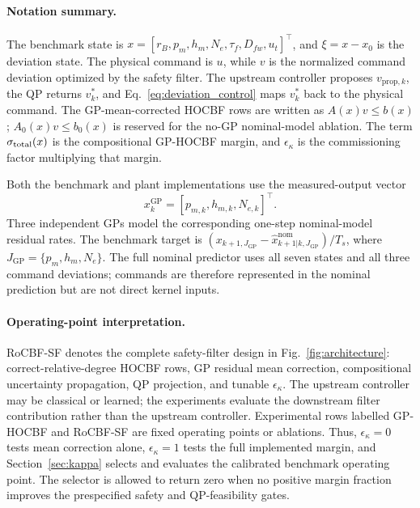 \paragraph{Notation summary.}
The benchmark state is $x=[r_B,p_m,h_m,N_e,\tau_f,D_{fw},u_t]^\top$, and $\xi=x-x_0$ is the deviation state. The physical command is $u$, while $v$ is the normalized command deviation optimized by the safety filter. The upstream controller proposes $v_{\mathrm{prop},k}$, the QP returns $v_k^*$, and Eq.~\eqref{eq:deviation_control} maps $v_k^*$ back to the physical command. The GP-mean-corrected HOCBF rows are written as $A(x)v\leq b(x)$; $A_0(x)v\leq b_0(x)$ is reserved for the no-GP nominal-model ablation. The term $\sigma_{\mathrm{total}}(x)$ is the compositional GP-HOCBF margin, and $\epsilon_\kappa$ is the commissioning factor multiplying that margin.

Both the benchmark and plant implementations use the measured-output vector
\begin{equation}
    x_k^{\mathrm{GP}}=[p_{m,k},h_{m,k},N_{e,k}]^\top .
    \label{eq:gp_input_vector}
\end{equation}
Three independent GPs model the corresponding one-step nominal-model residual rates. The benchmark target is $(x_{k+1,J_{\mathrm{GP}}}-\hat{x}^{\mathrm{nom}}_{k+1|k,J_{\mathrm{GP}}})/T_s$, where $J_{\mathrm{GP}}=\{p_m,h_m,N_e\}$. The full nominal predictor uses all seven states and all three command deviations; commands are therefore represented in the nominal prediction but are not direct kernel inputs.

\paragraph{Operating-point interpretation.}
RoCBF-SF denotes the complete safety-filter design in Fig.~\ref{fig:architecture}: correct-relative-degree HOCBF rows, GP residual mean correction, compositional uncertainty propagation, QP projection, and tunable $\epsilon_\kappa$. The upstream controller may be classical or learned; the experiments evaluate the downstream filter contribution rather than the upstream controller. Experimental rows labelled GP-HOCBF and RoCBF-SF are fixed operating points or ablations. Thus, $\epsilon_\kappa=0$ tests mean correction alone, $\epsilon_\kappa=1$ tests the full implemented margin, and Section~\ref{sec:kappa} selects and evaluates the calibrated benchmark operating point. The selector is allowed to return zero when no positive margin fraction improves the prespecified safety and QP-feasibility gates.

